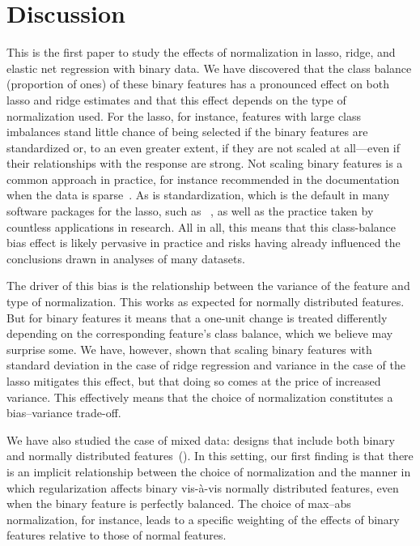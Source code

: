 \section{Discussion}


This is the first paper to study the effects of normalization in lasso, ridge, and elastic
net regression with binary data. We have discovered that the class balance (proportion of
ones) of these binary features has a pronounced effect on both lasso and ridge estimates
and that this effect depends on the type of normalization used. For the lasso, for
instance, features with large class imbalances stand little chance of being selected if the
binary features are standardized or, to an even greater extent, if they are not scaled at
all---even if their relationships with the response are strong. Not scaling binary features
is a common approach in practice, for instance recommended in the 
documentation when the data is sparse~\citep{scikit-learndevelopers2025}. As is
standardization, which is the default in many software packages for the lasso, such as
~\citep{friedman2010}, as well as the practice taken by countless applications
in research. All in all, this means that this class-balance bias effect is likely pervasive
in practice and risks having already influenced the conclusions drawn in analyses of many
datasets.

The driver of this bias is the relationship between the variance of the feature and type of
normalization. This works as expected for normally distributed features. But for binary
features it means that a one-unit change is treated differently depending on the
corresponding feature's class balance, which we believe may surprise some. We have,
however, shown that scaling binary features with standard deviation in the case of ridge
regression and variance in the case of the lasso mitigates this effect, but that doing so
comes at the price of increased variance. This effectively means that the choice of
normalization constitutes a bias--variance trade-off.

We have also studied the case of mixed data: designs that include both binary and normally
distributed features~(). In this setting, our first finding is that
there is an implicit relationship between the choice of normalization and the manner in
which regularization affects binary vis-à-vis normally distributed features, even when the
binary feature is perfectly balanced. The choice of max--abs normalization, for instance,
leads to a specific weighting of the effects of binary features relative to those of normal
features.


